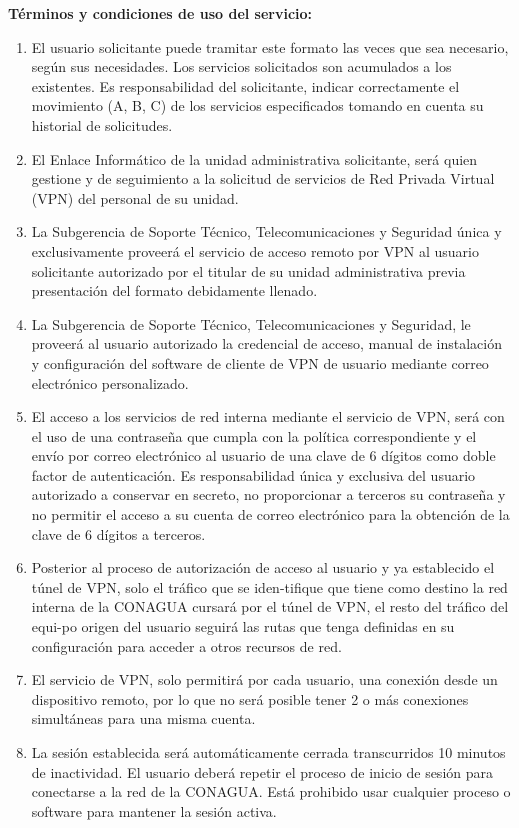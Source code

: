 \documentclass[letterpaper,11pt]{article}
\begin{document}
\textbf{ Términos y condiciones de uso del servicio:}
{ \begin{enumerate}
	\item El usuario solicitante puede tramitar este formato las veces que sea necesario, según sus necesidades. Los servicios solicitados son acumulados a los existentes. Es responsabilidad del solicitante, indicar correctamente el movimiento (A, B, C) de los servicios especificados tomando en cuenta su historial de solicitudes.
	\item El Enlace Informático de la unidad administrativa solicitante, será quien gestione y de seguimiento a la solicitud de servicios de Red Privada Virtual (VPN) del personal de su unidad. 
	\item La Subgerencia de Soporte Técnico, Telecomunicaciones y Seguridad única y exclusivamente proveerá el servicio de acceso remoto por VPN al usuario solicitante autorizado por el titular de su unidad administrativa previa presentación del formato debidamente llenado.
	\item La Subgerencia de Soporte Técnico, Telecomunicaciones y Seguridad, le proveerá al usuario autorizado la credencial de acceso, manual de instalación y configuración del software de cliente de VPN de usuario mediante correo electrónico personalizado.
	\item El acceso a los servicios de red interna mediante el servicio de VPN, será con el uso de una contraseña que cumpla con la política correspondiente y el envío por correo electrónico al usuario de una clave de 6 dígitos como doble factor de autenticación. Es responsabilidad única y exclusiva del usuario autorizado a conservar en secreto, no proporcionar a terceros su contraseña y no permitir el acceso a su cuenta de correo electrónico para la obtención de la clave de 6 dígitos a terceros.
	\item Posterior al proceso de autorización de acceso al usuario y ya establecido el túnel de VPN, solo el tráfico que se iden-tifique que tiene como destino la red interna de la CONAGUA cursará por el túnel de VPN, el resto del tráfico del equi-po origen del usuario seguirá las rutas que tenga definidas en su configuración para acceder a otros recursos de red.
	\item El servicio de VPN, solo permitirá por cada usuario, una conexión desde un dispositivo remoto, por lo que no será posible tener 2 o más conexiones simultáneas para una misma cuenta.
	\item La sesión establecida será automáticamente cerrada transcurridos 10 minutos de inactividad. El usuario deberá repetir el proceso de inicio de sesión para conectarse a la red de la CONAGUA. Está prohibido usar cualquier proceso o software para mantener la sesión activa.

\end{enumerate}}
\end{document}
